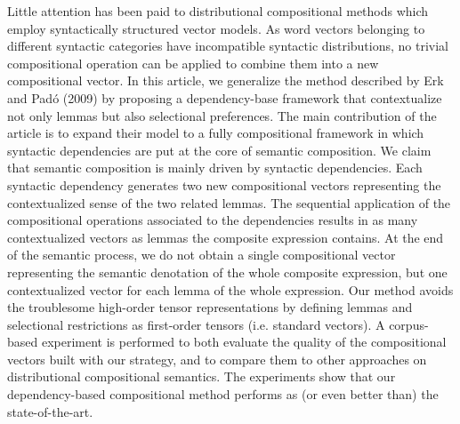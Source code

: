 Little attention has been paid to distributional compositional methods which employ syntactically structured vector models. As word vectors belonging to different syntactic categories                                      have incompatible syntactic distributions, no trivial compositional operation can be applied to combine them into a new compositional vector. In this article, we generalize the method described by Erk and Padó (2009) by proposing a dependency-base framework that contextualize not only lemmas but also selectional preferences.  The main contribution of the article is to expand their model to a fully compositional framework in which syntactic dependencies are put at the core of semantic composition. We claim that semantic composition is mainly driven by syntactic dependencies. Each syntactic dependency generates two new compositional vectors representing the contextualized sense of the two related lemmas.  The sequential application of the compositional operations associated to the dependencies results in as many contextualized vectors as lemmas the composite expression contains. At the end of the semantic process, we do not obtain a single compositional vector representing the semantic denotation of the whole composite expression, but one contextualized vector for each lemma of the whole expression. Our method avoids the troublesome high-order tensor representations by defining lemmas and selectional restrictions as first-order tensors (i.e. standard vectors). A corpus-based experiment is performed to both evaluate the quality of the compositional vectors built with our strategy, and to compare them to other approaches on distributional compositional semantics. The experiments show that our dependency-based compositional method performs as  (or even better than) the state-of-the-art.

